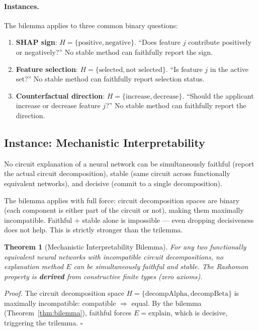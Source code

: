 \documentclass{article}
\newtheorem{theorem}{Theorem}
\begin{document}
\paragraph{Instances.}
The bilemma applies to three common binary questions:
\begin{enumerate}
\item \textbf{SHAP sign}: $H = \{\text{positive}, \text{negative}\}$. ``Does feature $j$ contribute positively or negatively?'' No stable method can faithfully report the sign.
\item \textbf{Feature selection}: $H = \{\text{selected}, \text{not selected}\}$. ``Is feature $j$ in the active set?'' No stable method can faithfully report selection status.
\item \textbf{Counterfactual direction}: $H = \{\text{increase}, \text{decrease}\}$. ``Should the applicant increase or decrease feature $j$?'' No stable method can faithfully report the direction.
\end{enumerate}

\subsection{Instance: Mechanistic Interpretability}
\label{sec:mech-interp}

No circuit explanation of a neural network can be simultaneously faithful (report the actual circuit decomposition), stable (same circuit across functionally equivalent networks), and decisive (commit to a single decomposition).

The bilemma applies with full force: circuit decomposition spaces are binary (each component is either part of the circuit or not), making them maximally incompatible. Faithful + stable alone is impossible --- even dropping decisiveness does not help. This is strictly stronger than the trilemma.

\begin{theorem}[Mechanistic Interpretability Bilemma]\label{thm:mech-interp-bilemma}
For any two functionally equivalent neural networks with incompatible circuit decompositions, no explanation method $E$ can be simultaneously faithful and stable. The Rashomon property is \textbf{derived} from constructive finite types (zero axioms).
\end{theorem}

\noindent\textit{Proof.}
The circuit decomposition space $H = \{\text{decompAlpha}, \text{decompBeta}\}$ is maximally incompatible: compatible $\Rightarrow$ equal. By the bilemma (Theorem~\ref{thm:bilemma}), faithful forces $E = \text{explain}$, which is decisive, triggering the trilemma. \hfill$\square$
\end{document}
